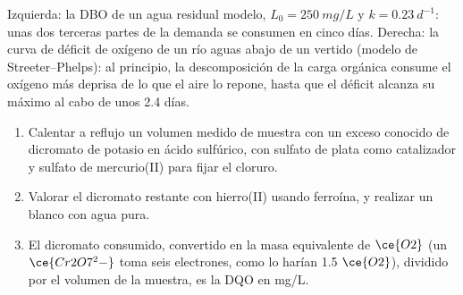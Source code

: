 \begin{omfigure}

{\small Izquierda: la DBO de un agua residual modelo, $L_0 = \qty{250}{mg/L}$ y $k = \qty{0.23}{d^{-1}}$: unas dos terceras partes de la
demanda se consumen en cinco días. Derecha: la curva de déficit de oxígeno de un río aguas abajo de un vertido
(modelo de Streeter--Phelps): al principio, la descomposición de la carga orgánica consume el oxígeno más deprisa
de lo que el aire lo repone, hasta que el déficit alcanza su máximo al cabo de unos 2.4 días.}
\end{omfigure}

\begin{method}\label{met:b3:environmental-toxicology:cod}
\begin{enumerate}
  \item Calentar a reflujo un volumen medido de muestra con un exceso conocido de dicromato
        de potasio en ácido sulfúrico, con sulfato de plata como catalizador y
        sulfato de mercurio(II) para fijar el cloruro.
  \item Valorar el dicromato restante con hierro(II) usando ferroína, y realizar un
        blanco con agua pura.
  \item El dicromato consumido, convertido en la masa equivalente de $\ce{O2}$ (un
        $\ce{Cr2O7^2-}$ toma seis electrones, como lo harían 1.5 $\ce{O2}$), dividido por el volumen de la muestra, es la
        DQO en mg/L.
\end{enumerate}
\end{method}

